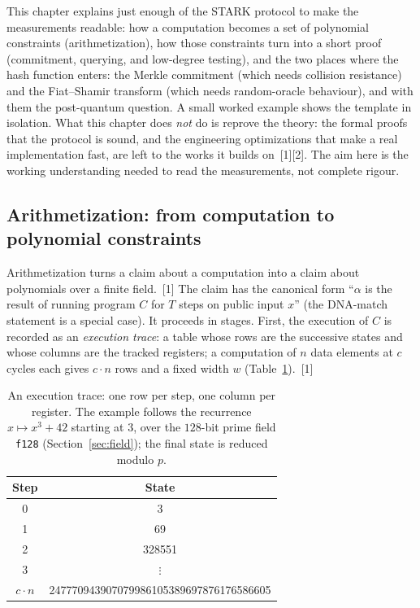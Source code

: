 \documentclass[11pt]{article}
\begin{document}
This chapter explains just enough of the STARK protocol to make the measurements readable: how a
computation becomes a set of polynomial constraints (arithmetization), how those constraints turn into a
short proof (commitment, querying, and low-degree testing), and the two places where the hash function
enters: the Merkle commitment (which needs collision resistance) and the Fiat--Shamir transform (which
needs random-oracle behaviour), and with them the post-quantum question. A small worked example shows the template in
isolation. What this chapter does \emph{not} do is reprove the theory: the formal proofs that the
protocol is sound, and the engineering optimizations that make a real implementation fast, are left to
the works it builds on~[1][2]. The aim here is the working understanding needed to read the
measurements, not complete rigour.

\subsection{Arithmetization: from computation to polynomial constraints}

Arithmetization turns a claim about a computation into a claim about polynomials over a finite
field.~[1] The claim has the canonical form ``$\alpha$ is the result of running program $C$ for $T$
steps on public input $x$'' (the DNA-match statement is a special case). It proceeds in stages. First,
the execution of $C$ is recorded as an \emph{execution trace}: a table whose rows are the successive
states and whose columns are the tracked registers; a computation of $n$ data elements at $c$ cycles
each gives $c\cdot n$ rows and a fixed width $w$ (Table~\ref{tab:trace}).~[1]

\begin{table}[htbp]\centering\footnotesize
\caption{An execution trace: one row per step, one column per register. The example follows the
recurrence $x \mapsto x^{3}+42$ starting at $3$, over the $128$-bit prime field \texttt{f128}
(Section~\ref{sec:field}); the final state is reduced modulo $p$.}
\label{tab:trace}
\begin{tabular}{c c}
\toprule
Step & State \\
\midrule
0          & 3 \\
1          & 69 \\
2          & 328551 \\
3          & $\vdots$ \\
$c\cdot n$ & \num{247770943907079986105389697876176586605} \\
\bottomrule
\end{tabular}
\end{table}
\end{document}
